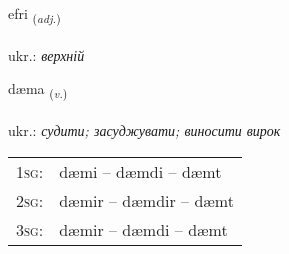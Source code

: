 \documentclass[frontgrid, backgrid]{flacards}\usepackage[]{graphicx}\usepackage[]{xcolor}
\begin{document}
\renewcommand{\flhead}{\vskip5pt \fboxsep=0pt {\small\bfseries\footnotesize Lýsingarorð | прикметник}}
\renewcommand{\fcfoot}{\vskip5pt \fboxsep=0pt \hspace{2pt}{\small\bfseries\footnotesize 1K}}

\renewcommand{\blhead}{\vskip5pt {\small\bfseries\footnotesize Lýsingarorð | прикметник }}
\renewcommand{\bcfoot}{\vskip5pt \hspace{2pt}{\small\bfseries\footnotesize 1K}}


{efri \small{\textsubscript{(\textit{adj.})}} \\[1ex] %
\textphonetic{[ɛvrɪ]} \\
ukr.: \emph{верхній} \\  [2ex]
\renewcommand*{\arraystretch}{0.8}
}

\renewcommand{\flhead}{\vskip5pt \fboxsep=0pt {\small\bfseries\footnotesize Sagnorð | дієслово}}
\renewcommand{\fcfoot}{\vskip5pt \fboxsep=0pt \hspace{2pt}{\small\bfseries\footnotesize 1K}}

\renewcommand{\blhead}{\vskip5pt {\small\bfseries\footnotesize Sagnorð | дієслово }}
\renewcommand{\bcfoot}{\vskip5pt \hspace{2pt}{\small\bfseries\footnotesize 1K}}


{dæma \small{\textsubscript{(\textit{v.})}} \\[1ex] %
\textphonetic{[taiːma]} \\
ukr.: \emph{судити; засуджувати; виносити вирок} \\  [2ex]
\renewcommand*{\arraystretch}{0.8}
\begin{tabular}{p{1cm}l}
\textsc{1sg}: & dæmi -- dæmdi -- dæmt \\ 
\textsc{2sg}: & dæmir -- dæmdir -- dæmt \\ 
\textsc{3sg}: & dæmir -- dæmdi -- dæmt \\ 
\end{tabular}
}
\end{document}
